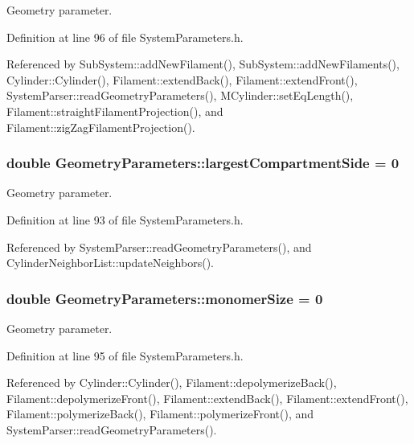 Geometry parameter. 



Definition at line 96 of file System\+Parameters.\+h.



Referenced by Sub\+System\+::add\+New\+Filament(), Sub\+System\+::add\+New\+Filaments(), Cylinder\+::\+Cylinder(), Filament\+::extend\+Back(), Filament\+::extend\+Front(), System\+Parser\+::read\+Geometry\+Parameters(), M\+Cylinder\+::set\+Eq\+Length(), Filament\+::straight\+Filament\+Projection(), and Filament\+::zig\+Zag\+Filament\+Projection().

\hypertarget{structGeometryParameters_a0b14f97d476bd4d40bf32a75715814b0}{
\subsubsection[{largest\+Compartment\+Side}]{\setlength{\rightskip}{0pt plus 5cm}double Geometry\+Parameters\+::largest\+Compartment\+Side = 0}}\label{structGeometryParameters_a0b14f97d476bd4d40bf32a75715814b0}


Geometry parameter. 



Definition at line 93 of file System\+Parameters.\+h.



Referenced by System\+Parser\+::read\+Geometry\+Parameters(), and Cylinder\+Neighbor\+List\+::update\+Neighbors().

\hypertarget{structGeometryParameters_a7afc14cf30bc80757522bcabe8fb3bc9}{
\subsubsection[{monomer\+Size}]{\setlength{\rightskip}{0pt plus 5cm}double Geometry\+Parameters\+::monomer\+Size = 0}}\label{structGeometryParameters_a7afc14cf30bc80757522bcabe8fb3bc9}


Geometry parameter. 



Definition at line 95 of file System\+Parameters.\+h.



Referenced by Cylinder\+::\+Cylinder(), Filament\+::depolymerize\+Back(), Filament\+::depolymerize\+Front(), Filament\+::extend\+Back(), Filament\+::extend\+Front(), Filament\+::polymerize\+Back(), Filament\+::polymerize\+Front(), and System\+Parser\+::read\+Geometry\+Parameters().

